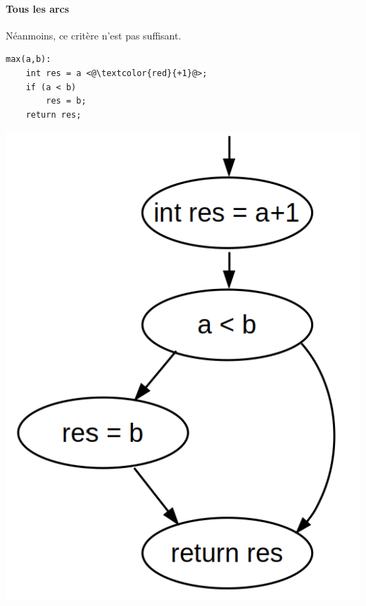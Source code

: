 \paragraph{Tous les arcs} Néanmoins, ce critère n'est pas suffisant.
\\
\begin{minipage}{0.5\linewidth}
\begin{lstlisting}
max(a,b):
    int res = a <@\textcolor{red}{+1}@>;
    if (a < b)
        res = b;
    return res;
\end{lstlisting}
\end{minipage}
\begin{minipage}{0.5\linewidth}
	\begin{center}
		\includegraphics[scale=0.2]{Developpements/critere de test/cas_21.png}
	\end{center}
\end{minipage}

